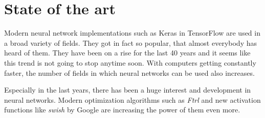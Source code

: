 \section{State of the art}
\label{sec:state-of-the-art}

Modern neural network implementations such as Keras in TensorFlow \cite{tensorflow2015-whitepaper} are used in a broad variety of fields.
They got in fact so popular, that almost everybody has heard of them.
They have been on a rise for the last 40 years and it seems like this trend is not going to stop anytime soon.
With computers getting constantly faster, the number of fields in which neural networks can be used also increases.

Especially in the last years, there has been a huge interest and development in neural networks.
Modern optimization algorithms such as \emph{Ftrl} \cite{McMahan} and new activation functions like \emph{swish} \cite{DBLP:journals/corr/abs-1710-05941} by Google are increasing the power of them even more.
